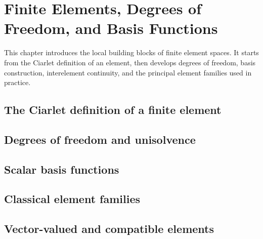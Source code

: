 \chapter{Finite Elements, Degrees of Freedom, and Basis Functions}
\label{ch:elements}

This chapter introduces the local building blocks of finite element spaces. It
starts from the Ciarlet definition of an element, then develops degrees of
freedom, basis construction, interelement continuity, and the principal element
families used in practice.

\section{The Ciarlet definition of a finite element}
\label{sec:elements:ciarlet}


\section{Degrees of freedom and unisolvence}
\label{sec:elements:unisolvence}


\section{Scalar basis functions}
\label{sec:elements:scalar_basis}


\section{Classical element families}
\label{sec:elements:families}


\section{Vector-valued and compatible elements}
\label{sec:elements:compatible}


